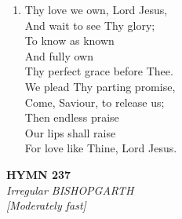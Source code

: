 \begin{enumerate}
    \item Thy love we own, Lord Jesus, \\
        And wait to see Thy glory; \\
            To know as known \\
            And fully own \\
        Thy perfect grace before Thee. \\
        We plead Thy parting promise, \\
        Come, Saviour, to release us; \\
            Then endless praise \\
            Our lips shall raise \\
        For love like Thine, Lord Jesus.

\end{enumerate}

\newpage
\begin{center}
    {\Large \textbf{HYMN 237}}
    \\
    \textit{Irregular BISHOPGARTH}
    \\
    \textit{\small [Moderately fast]}
\end{center}
\vspace{1em}

